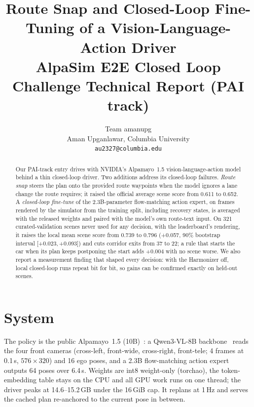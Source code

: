 \documentclass{article}
\title{Route Snap and Closed-Loop Fine-Tuning of a Vision-Language-Action Driver\\
\large AlpaSim E2E Closed Loop Challenge Technical Report (PAI track)}
\author{
  Team amanupg \\
  Aman Upganlawar, Columbia University \\
  \texttt{au2327@columbia.edu}
}
\begin{document}
\maketitle

\begin{abstract}
Our PAI-track entry drives with NVIDIA's Alpamayo~1.5 vision-language-action model behind a thin closed-loop
driver. Two additions address its closed-loop failures. \emph{Route snap} steers the plan onto the provided route
waypoints when the model ignores a lane change the route requires; it raised the official average scene score from
0.611 to 0.652. A \emph{closed-loop fine-tune} of the 2.3B-parameter flow-matching action expert, on frames rendered by
the simulator from the training split, including recovery states, is averaged with the released weights and paired
with the model's own route-text input. On 321 curated-validation scenes never used for any decision, with the
leaderboard's rendering, it raises the local mean scene score from 0.739 to 0.796 (+0.057, 90\% bootstrap interval
[+0.023,\,+0.093]) and cuts corridor exits from 37 to 22; a rule that starts the car when its plan keeps postponing
the start adds +0.004 with no scene worse. We also report a measurement finding that shaped every
decision: with the Harmonizer off, local closed-loop runs repeat bit for bit, so gains can be confirmed exactly on
held-out scenes.
\end{abstract}

\section{System}
The policy is the public Alpamayo~1.5 (10B)~\cite{alpamayo15}: a Qwen3-VL-8B backbone~\cite{qwen3vl} reads the four
front cameras (cross-left, front-wide, cross-right, front-tele; 4 frames at 0.1\,s, $576\times320$) and 16 ego poses,
and a 2.3B flow-matching action expert outputs 64 poses over 6.4\,s. Weights are int8 weight-only (torchao), the
token-embedding table stays on the CPU and all GPU work runs on one thread; the driver peaks at 14.6--15.2\,GB under
the 16\,GiB cap. It replans at 1\,Hz and serves the cached plan re-anchored to the current pose in between.
\end{document}

